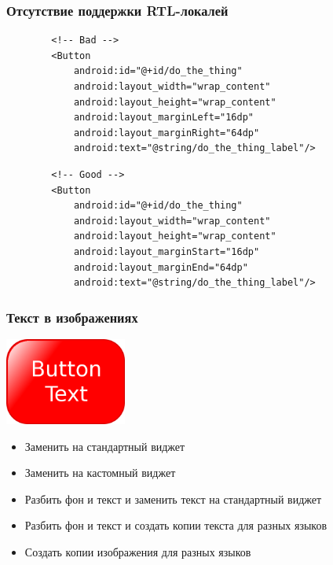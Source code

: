 \documentclass{beamer}
\begin{document}
\begin{frame}[fragile]
    \frametitle{Отсутствие поддержки RTL-локалей}
    \begin{verbatim}
        <!-- Bad -->
        <Button
            android:id="@+id/do_the_thing"
            android:layout_width="wrap_content"
            android:layout_height="wrap_content"
            android:layout_marginLeft="16dp"
            android:layout_marginRight="64dp"
            android:text="@string/do_the_thing_label"/>
    \end{verbatim}
    \begin{verbatim}
        <!-- Good -->
        <Button
            android:id="@+id/do_the_thing"
            android:layout_width="wrap_content"
            android:layout_height="wrap_content"
            android:layout_marginStart="16dp"
            android:layout_marginEnd="64dp"
            android:text="@string/do_the_thing_label"/>
    \end{verbatim}
\end{frame}

\begin{frame}
    \frametitle{Текст в изображениях}
    \begin{center}
        \includegraphics[width=0.3\textwidth,keepaspectratio]{images/button}
    \end{center}
    \begin{itemize}
        \item Заменить на стандартный виджет
        \item Заменить на кастомный виджет
        \item Разбить фон и текст и заменить текст на стандартный виджет
        \item Разбить фон и текст и создать копии текста для разных языков
        \item Создать копии изображения для разных языков
    \end{itemize}
\end{frame}
\end{document}

